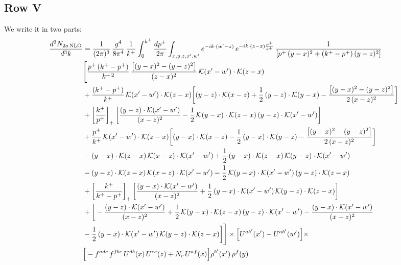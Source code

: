 \documentclass[9pt]{article}
\numberwithin{equation}{section}
\begin{document}
\subsection{Row V}
We write it in two parts: 
\begin{align}
\frac{d^{3}N_{2a\,\rm NLO}}{d^{3}k} & = \frac{1}{(2\pi)^{3}}\,\frac{g^{4}}{8\pi^{4}}\,\frac{1}{k^{+}}\int_{0}^{k^{+}}\frac{dp^{+}}{2\pi}\int_{x,y,z,x',w'} e^{-ik\cdot(w'-z)}\,e^{-ik\cdot (z-x)\frac{p^{+}}{k^{+}}}\,\frac{1}{\left[p^{+}\,(y-x)^{2}+(k^{+}-p^{+})\,(y-z)^{2}\right]} \notag \\
& \Bigg[\frac{p^{+}\,(k^{+}-p^{+})}{k^{+\,2}}\,\frac{\left[(y-x)^{2}-(y-z)^{2}\right]}{(z-x)^{2}}\,\mathcal{K}(x'-w')\cdot\mathcal{K}(z-x)\notag \\
& +\frac{(k^{+}-p^{+})}{k^{+}}\,\mathcal{K}(x'-w')\cdot\mathcal{K}(z-x)\bigg[(y-z)\cdot\mathcal{K}(x-z)+\frac{1}{2}\,(y-z)\cdot\mathcal{K}(y-x)-\frac{\left[(y-x)^{2}-(y-z)^{2}\right]}{2\,(x-z)^{2}}\bigg]\notag \\
& +\left[\frac{k^{+}}{p^{+}}\right]_{+}\bigg[\frac{(y-z)\cdot\mathcal{K}(x'-w')}{(x-z)^{2}}-\frac{1}{2}\,\mathcal{K}(y-x)\cdot\mathcal{K}(z-x)\,(y-z)\cdot\mathcal{K}(x'-w')\bigg]\notag \\
& +\frac{p^{+}}{k^{+}}\,\mathcal{K}(x'-w')\cdot\mathcal{K}(z-x)\bigg[(y-x)\cdot\mathcal{K}(x-z)-\frac{1}{2}\,(y-x)\cdot\mathcal{K}(y-z)-\frac{\left[(y-x)^{2}-(y-z)^{2}\right]}{2\,(x-z)^{2}}\bigg]\notag \\
& -(y-x)\cdot\mathcal{K}(z-x)\,\mathcal{K}(x-z)\cdot\mathcal{K}(x'-w')+\frac{1}{2}\,(y-x)\cdot\mathcal{K}(z-x)\,\mathcal{K}(y-z)\cdot\mathcal{K}(x'-w')\notag \\
& -(y-z)\cdot\mathcal{K}(z-x)\,\mathcal{K}(x-z)\cdot\mathcal{K}(x'-w')-\frac{1}{2}\,\mathcal{K}(y-x)\cdot\mathcal{K}(x'-w')\,(y-z)\cdot\mathcal{K}(z-x)\notag \\
& +\left[\frac{k^{+}}{k^{+}-p^{+}}\right]_{+}\bigg[\frac{(y-x)\cdot\mathcal{K}(x'-w')}{(x-z)^{2}}+\frac{1}{2}\,(y-x)\cdot\mathcal{K}(x'-w')\,\mathcal{K}(y-z)\cdot\mathcal{K}(z-x)\bigg]\notag \\
& +\bigg[-\frac{(y-z)\cdot\mathcal{K}(x'-w')}{(x-z)^{2}}+\frac{1}{2}\,\mathcal{K}(y-x)\cdot\mathcal{K}(z-x)\,(y-z)\cdot\mathcal{K}(x'-w')-\frac{(y-x)\cdot\mathcal{K}(x'-w')}{(x-z)^{2}}\notag \\ & -\frac{1}{2}\,(y-x)\cdot\mathcal{K}(x'-w')\,\mathcal{K}(y-z)\cdot\mathcal{K}(z-x)\bigg]\Bigg]\times\Big[U^{ab'}(x')-U^{ab'}(w')\Big]\times\notag \\ & \Big[-f^{adc}\,f^{fbe}\,U^{db}(x)\,U^{ce}(z)+N_{c}\,U^{af}(x)\Big]\rho^{b'}(x')\,\rho^{f}(y)
\end{align}
\end{document}
